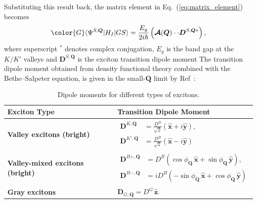 Substituting this result back, the matrix element in Eq.~(\ref{eq:matrix_element})~\cite{peng2022tailoring, sanchez2024enhanced} becomes
\begin{equation}
\color{G}
\langle\Psi^{S, \boldsymbol{Q}}|H_I|GS\rangle 
=
\frac{E_g}{2i\hslash}
\left(
\boldsymbol{\mathcal{A}}(\boldsymbol{Q})  \cdot \cdot 
\boldsymbol{D}^{S, \boldsymbol{Q} *}
\right),
\label{firstmatrixelement}
\end{equation}
where superscript $^*$ denotes complex conjugation, $E_g$ is the band gap at the $K/K'$ valleys and $\boldsymbol{D}^{S, \boldsymbol{Q}}$ is the exciton transition dipole moment The transition dipole moment obtained from density functional theory combined with the Bethe--Salpeter equation, is given in the small-$\boldsymbol{Q}$ limit by Ref~\cite{peng2022tailoring, sanchez2024enhanced}:
\begin{table}[h]
\color{G}
\centering
\caption{Dipole moments for different types of excitons.} %
\label{tab:exciton_dipoles}
\renewcommand{\arraystretch}{1.5} %
\begin{tabular}{ll}
\hline\hline
\textbf{Exciton Type} & \textbf{Transition Dipole Moment} \\ \hline
\textbf{Valley excitons (bright)} & 
$\begin{aligned}
    \boldsymbol{D}^{K, \boldsymbol{Q}} &= \frac{D^B}{\sqrt{2}} (\hat{\boldsymbol{x}}+i\hat{\boldsymbol{y}}), \\
    \boldsymbol{D}^{K', \boldsymbol{Q}} &= \frac{D^B}{\sqrt{2}} (\hat{\boldsymbol{x}}-i\hat{\boldsymbol{y}})
\end{aligned}$ \\ \hline
\textbf{Valley-mixed excitons (bright)} & 
$\begin{aligned}
    \boldsymbol{D}^{B+, \boldsymbol{Q}} &= D^B\left(\cos\phi_{\boldsymbol{Q}}\,\hat{\boldsymbol{x}} + \sin\phi_{\boldsymbol{Q}}\,\hat{\boldsymbol{y}}\right), \\
    \boldsymbol{D}^{B-, \boldsymbol{Q}} &= iD^B \left(-\sin\phi_{\boldsymbol{Q}}\,\hat{\boldsymbol{x}} + \cos\phi_{\boldsymbol{Q}}\,\hat{\boldsymbol{y}}\right)
\end{aligned}$ \label{transitiondipole} \\ \hline
\textbf{Gray excitons} & 
$\boldsymbol{D}_{G, \boldsymbol{Q}} = D^G\,\hat{\boldsymbol{z}}.$ \\ \hline\hline
\end{tabular}
\end{table}

